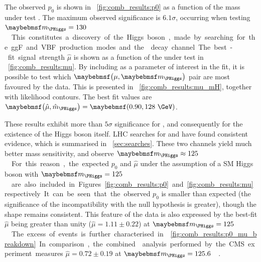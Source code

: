 The observed $p_0$ is shown in \Figure~\ref{fig:comb_results:p0} as a function of the mass 
under test \mH.  The maximum observed significance is $6.1\sigma$, occurring when testing 
\unit{$\mH = 130$}{\GeV}. This constitutes a discovery of the Higgs boson, made by searching 
for the ggF and VBF production modes and the \WW decay channel.

The best-fit signal strength $\hat{\mu}$ is shown as a function of the \mH under test in 
\Figure~\ref{fig:comb_results:mu}. By including \mH as a parameter of interest in the fit, 
it is possible to test which $\parenths{\mu, \mH}$ pair are most favoured by the data. This 
is presented in \Figure~\ref{fig:comb_results:mu_mH}, together with likelihood contours. The 
best fit values are $\parenths{\hat{\mu}, \hat{m}_{\PHiggs}} = \parenths{0.90, 128~\GeV}$.

These results exhibit more than $5\sigma$ significance for \HWWlvlv, and consequently for 
the existence of the Higgs boson itself. LHC searches for 
\HepProcess{\PHiggs \HepTo \Pphoton\Pphoton} and \HepProcess{\PHiggs \HepTo \PZ\PZ} have 
found consistent evidence, which is summarised in \Section~\ref{sec:searches}. These two 
channels yield much better mass sensitivity, and observe \unit{$\mH \approx 125$}{\GeV}. 
For this reason, the expected $p_0$ and $\hat{\mu}$ under the assumption of a SM Higgs boson 
with \unit{$\mH = 125$}{\GeV} are also included in Figures~\ref{fig:comb_results:p0} and 
\ref{fig:comb_results:mu} respectively. It can be seen that the observed $p_0$ is smaller 
than expected (\ie the significance of the incompatibility with the null hypothesis is 
greater), though the shape remains consistent. This feature of the data is also expressed by 
the best-fit $\hat{\mu}$ being greater than unity ($\hat{\mu} = 1.11 \pm 0.22$) at 
\unit{$\mH = 125$}{\GeV}. The excess of events is further characterised in 
\Figure~\ref{fig:comb_results:p0_mu_breakdown}. In comparison, the combined \HWW analysis 
performed by the CMS experiment measures $\hat{\mu} = 0.72 \pm 0.19$ at 
\unit{$\mH = 125.6$}{\GeV} \cite{CMS:HWW}.

